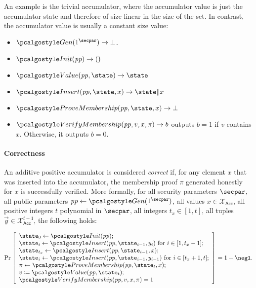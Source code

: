 \begin{example}
  An example is the trivial accumulator\label{sec:trivial-acc}, where the accumulator value is just the accumulator state and therefore of size linear in the size of the set. In contrast, the accumulator value is usually a constant size value:
  \begin{itemize}
    \item $\algo{Gen}(1^\secpar)\rightarrow \bot$.
    \item $\algo{Init}(\params)\rightarrow ()$
    \item $\algo{Value}(\params, \state)\rightarrow \state$
    \item $\algo{Insert}(\params, \state, x) \rightarrow \state \| x$
    \item $\algo{ProveMembership}(\params, \state, x) \rightarrow \bot$
    \item $\algo{VerifyMembership}(\params, v, x, \pi) \rightarrow b$ outputs $b = 1$ if $v$ contains $x$. Otherwise, it outputs $b = 0$.
  \end{itemize}
\end{example}

\paragraph{Correctness}

\begin{definition}[Correctness]
An additive positive accumulator is considered \emph{correct} if, for any element $x$ that was inserted into the accumulator, the membership proof $\pi$ generated honestly for $x$ is successfully verified.
More formally, for all security parameters $\secpar$, all public parameters $\params \gets \algo{Gen}(1^\secpar)$, all values $x \in \mathcal{X}_\mathsf{Acc}$, all positive integers $t$ polynomial in $\secpar$, all integers $t_x \in [1, t]$, all tuples $\vec{y} \in \mathcal{X}_\mathsf{Acc}^{t- 1}$, the following holds:

\[
    \Pr\left[
    \begin{array}{l}
        \state_0 \gets \algo{Init}(\params); \\
        \state_i \gets \algo{Insert}(\params, \state_{i - 1}, y_i) \text{ for } i \in [1, t_x - 1]; \\
        \state_{t_x} \gets \algo{Insert}(\params, \state_{i - 1}, x); \\
        \state_i \gets \algo{Insert}(\params, \state_{i - 1}, y_{i - 1}) \text{ for } i \in [t_x + 1, t]; \\
        \pi \gets \algo{ProveMembership}(\params, \state_t, x); \\
        v \defeq \algo{Value}(\params, \state_t); \\
        \algo{VerifyMembership}(\params, v, x, \pi) = 1
    \end{array}
    \right] = 1 - \negl.
\]
\end{definition}

